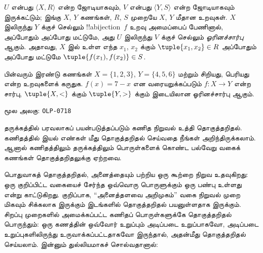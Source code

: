 \documentclass[11pt,a4paper,openany]{memoir}
\begin{document}
\begin{defn}[ஓரினச்சார்பு]
$U$ என்பது $\langle X, R\rangle$ என்ற ஜோடியாகவும், $V$ என்பது
$\langle Y, S\rangle$ என்ற ஜோடியாகவும் இருக்கட்டும்; இங்கு
$X$, $Y$ கணங்கள், $R$, $S$ முறையே $X$, $Y$ மீதான உறவுகள்.
$X$ இலிருந்து $Y$ க்குச் செல்லும் !!a{bijection}~$f$ உறவு
அமைப்பைப் பேணினால், அப்போதும் அப்போது மட்டுமே, அது $U$ இலிருந்து
$V$ க்குச் செல்லும் \emph{ஓரினச்சார்பு} ஆகும். அதாவது,
$X$ இல் உள்ள எந்த $x_{1}$, $x_{2}$ க்கும்
$\tuple{x_1,x_2} \in R$ அப்போதும் அப்போது மட்டுமே
$\tuple{f(x_1),f(x_2)} \in S$.
\end{defn}

\begin{ex}
பின்வரும் இரண்டு கணங்கள் $X=\{1,2,3\}$,
$Y=\{4,5,6\}$ மற்றும் சிறியது, பெரியது என்ற உறவுகளைக்
கருதுக. $f(x) = 7-x$ என வரையறுக்கப்படும்
$f\colon X \to Y$ என்ற சார்பு, $\tuple{X,<}$ க்கும்
$\tuple{Y,>}$ க்கும் இடையிலான ஓரினச்சார்பு ஆகும்.
\end{ex}



\clearpage
\noindent மூல அலகு: \texttt{OLP-0718}\par





\begin{explain}
தருக்கத்தில் பரவலாகப் பயன்படுத்தப்படும் கணித நிறுவல் உத்தி
தொகுத்தறிதல். கணிதத்தில் இயல் எண்கள் மீது தொகுத்தறிதல் செய்வதை
நீங்கள் அறிந்திருக்கலாம். ஆனால் கணிதத்திலும் தருக்கத்திலும்
பொருள்களைக் கொண்ட பல்வேறு வகைக் கணங்கள் தொகுத்தறிதலுக்கு ஏற்றவை.

பொதுவாகத் தொகுத்தறிதல், அனைத்தையும் பற்றிய ஒரு கூற்றை நிறுவ
உதவுகிறது: ஒரு குறிப்பிட்ட வகையைச் சேர்ந்த ஒவ்வொரு பொருளுக்கும்
ஒரு பண்பு உள்ளது என்று காட்டுகிறது. குறிப்பாக,
``அனைத்தளவை அறிமுகம்'' வகை நிறுவல் முறை மிகவும் சிக்கலாக இருக்கும்
இடங்களில் தொகுத்தறிதல் பயனுள்ளதாக இருக்கும். சிறப்பு முறைகளில்
அமைக்கப்பட்ட கணிதப் பொருள்களுக்கே தொகுத்தறிதல் பொருந்தும்:
ஒரு கணத்தின் ஒவ்வோர் உறுப்பும் அடிப்படை உறுப்பாகவோ,
அடிப்படை உறுப்புகளிலிருந்து உருவாக்கப்பட்டதாகவோ இருந்தால்,
அதன்மீது தொகுத்தறிதல் செய்யலாம். இன்னும் துல்லியமாகச் சொல்வதானால்:
\end{explain}
\end{document}
